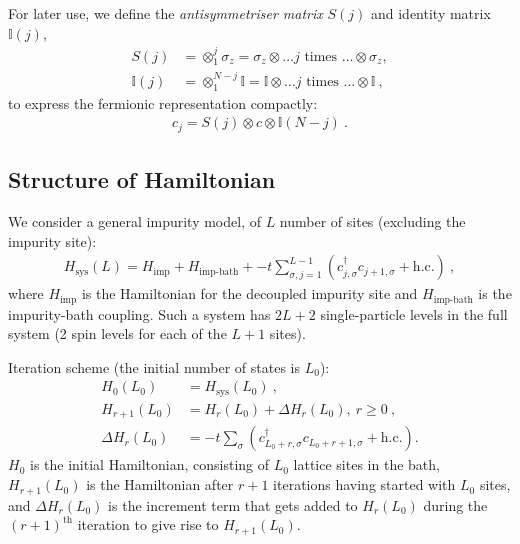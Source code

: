 \documentclass[reprint]{revtex4-2}
\begin{document}
For later use, we define the {\it antisymmetriser matrix} \(S(j)\) and identity matrix \(\mathbb{I}(j)\),
\begin{equation}\begin{aligned}
	S(j) &= \otimes_1^j \sigma_z = \sigma_z \otimes \ldots j\text{ times } \ldots \otimes \sigma_z,\\
	\mathbb{I}(j) &= \otimes_1^{N-j} \mathbb{I} = \mathbb{I} \otimes  \ldots j\text{ times } \ldots \otimes \mathbb{I}~,
\end{aligned}\end{equation}
to express the fermionic representation compactly:
\begin{equation}\begin{aligned}\label{jordanwigner}
	c_j = S(j) \otimes c \otimes \mathbb{I}(N-j)~.
\end{aligned}\end{equation}

\subsection{Structure of Hamiltonian}
We consider a general impurity model, of \(L\) number of sites (excluding the impurity site):
\begin{equation}\begin{aligned}\label{hamiltonian}
	H_\text{sys}(L) = H_\text{imp} + H_\text{imp-bath} +  
	- t\sum_{\sigma, j = 1}^{L-1}\left(c^\dagger_{j,\sigma}c_{j+1,\sigma} + \text{h.c.}\right) ~,
\end{aligned}\end{equation}
where \(H_\text{imp}\) is the Hamiltonian for the decoupled impurity site and \(H_\text{imp-bath}\) is the impurity-bath coupling. Such a system has \(2L+2\) single-particle levels in the full system (2 spin levels for each of the \(L+1\) sites).

Iteration scheme (the initial number of states is \(L_0\)):
\begin{equation}\begin{aligned}\label{iterationScheme}
	H_0(L_0) &= H_\text{sys}(L_0)~,\\
	H_{r+1}(L_0) &= H_r(L_0) + \Delta H_r(L_0), ~ r \geq 0~,\\
	\Delta H_r(L_0) &= - t\sum_{\sigma}\left(c^\dagger_{L_0 + r,\sigma}c_{L_0 + r+1,\sigma} + \text{h.c.}\right).
\end{aligned}\end{equation}
\(H_0\) is the initial Hamiltonian, consisting of \(L_0\) lattice sites in the bath, \(H_{r+1}(L_0)\) is the Hamiltonian after \(r+1\) iterations having started with \(L_0\) sites, and \(\Delta H_r(L_0)\) is the increment term that gets added to \(H_r(L_0)\) during the \((r+1)^\text{th}\) iteration to give rise to \(H_{r+1}(L_0)\). 
\end{document}
